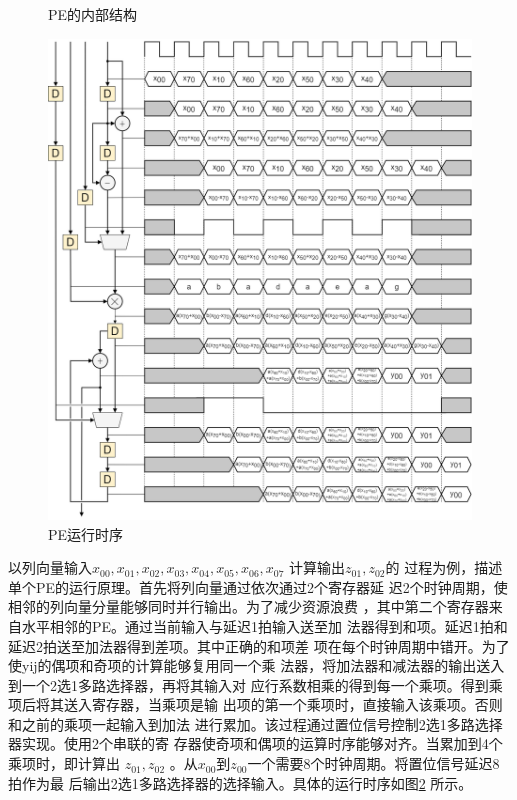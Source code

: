 \documentclass{article}
\numberwithin {equation}{section}
\begin{document}
\begin{spacing}{1.25}
\begin{figure}[H]
        \caption{PE的内部结构}
        \label{PE}
      \end{figure}
      \begin{figure}[H]
        \centering
        \includegraphics[scale=0.35]{./pictures/PE时序.png}
        \caption{PE运行时序}
        \label{PE运行时序}
      \end{figure}
      以列向量输入$x_{00},x_{01},x_{02},x_{03},x_{04},x_{05},x_{06},x_{07}$
      计算输出$z_{01},z_{02}$的
      过程为例，描述单个PE的运行原理。首先将列向量通过依次通过2个寄存器延
      迟2个时钟周期，使相邻的列向量分量能够同时并行输出。为了减少资源浪费
      ，其中第二个寄存器来自水平相邻的PE。通过当前输入与延迟1拍输入送至加
      法器得到和项。延迟1拍和延迟2拍送至加法器得到差项。其中正确的和项差
      项在每个时钟周期中错开。为了使yij的偶项和奇项的计算能够复用同一个乘
      法器，将加法器和减法器的输出送入到一个2选1多路选择器，再将其输入对
      应行系数相乘的得到每一个乘项。得到乘项后将其送入寄存器，当乘项是输
      出项的第一个乘项时，直接输入该乘项。否则和之前的乘项一起输入到加法
      进行累加。该过程通过置位信号控制2选1多路选择器实现。使用2个串联的寄
      存器使奇项和偶项的运算时序能够对齐。当累加到4个乘项时，即计算出
      $z_{01},z_{02}$
      。从$x_{00}$到$z_{00}$一个需要8个时钟周期。将置位信号延迟8拍作为最
      后输出2选1多路选择器的选择输入。具体的运行时序如图\ref{PE运行时序}
      所示。


\end{spacing}
\end{document}
